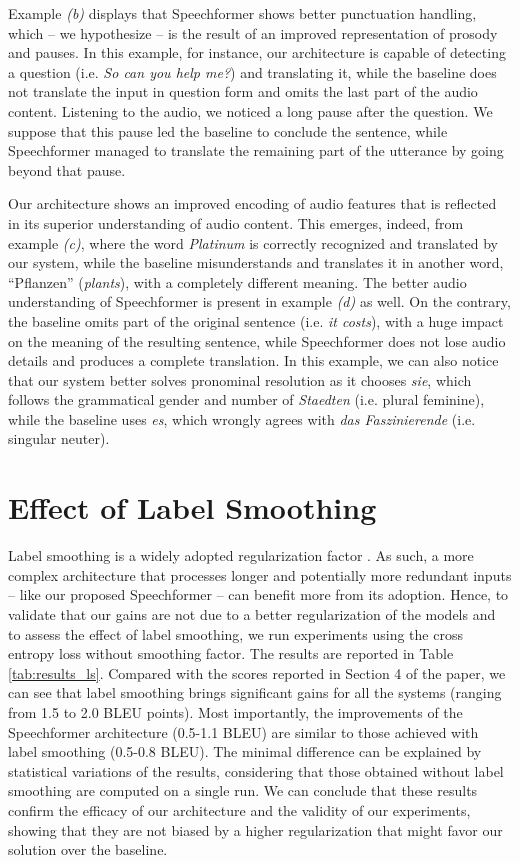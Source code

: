 \documentclass[11pt]{article}
\begin{document}
Example \emph{(b)} displays that Speechformer shows better punctuation handling, which -- we hypothesize -- is the result of an improved representation of prosody and pauses. In this example, for instance, our architecture is capable of detecting a question (i.e. \textit{So can you help me?}) and translating it, while the baseline does not translate the input in question form and omits the last part of the audio content. Listening to the audio, we noticed a long pause after the question. We suppose that this
pause led the baseline to conclude the sentence, while Speechformer managed to translate the remaining part of the utterance by going beyond that pause.

Our architecture
shows an improved encoding of audio features that is reflected in its superior understanding of audio content. This emerges, indeed, from example \emph{(c)}, where the word \textit{Platinum} is correctly recognized and translated by our system, while the baseline misunderstands and translates it in another word, ``Pflanzen'' (\textit{plants}), with a completely different meaning.
The better audio understanding of Speechformer is present in example \emph{(d)} as well.
On the contrary, the baseline omits part of the original sentence (i.e. \textit{it costs}), with a huge impact on the meaning of the resulting sentence, while Speechformer does not lose audio details and produces a complete translation.
In this example, we can also notice that our system better solves pronominal resolution as it chooses \emph{sie}, which follows the grammatical gender and number of \emph{Staedten} (i.e. plural feminine), while the baseline uses \emph{es}, which wrongly agrees with \emph{das Faszinierende} (i.e. singular neuter).






\section{Effect of Label Smoothing}
Label smoothing \cite{szegedy2016rethinking} is a widely adopted regularization factor \cite{zhang-2021-delving-deep}. As such, a more complex architecture that processes longer and potentially more redundant inputs -- like our proposed Speechformer -- can benefit more from its adoption. Hence, to validate that our gains are not due to a better regularization of the models and to assess the effect of label smoothing, we run experiments using the cross entropy loss without smoothing factor. The results are reported in Table \ref{tab:results_ls}. Compared with the scores reported in Section 4 of the paper, we can see that label smoothing brings significant gains for all the systems (ranging from 1.5 to 2.0 BLEU points). 
Most importantly, the improvements of the Speechformer architecture (0.5-1.1 BLEU) are similar to those achieved with label smoothing (0.5-0.8 BLEU). 
The minimal difference can be explained by statistical variations of the results, considering that those obtained without label smoothing are computed on a single run. We can conclude that these results confirm the efficacy of our architecture and the validity of our experiments, showing that they are not biased by a higher regularization that might favor our solution over the baseline.
\end{document}
